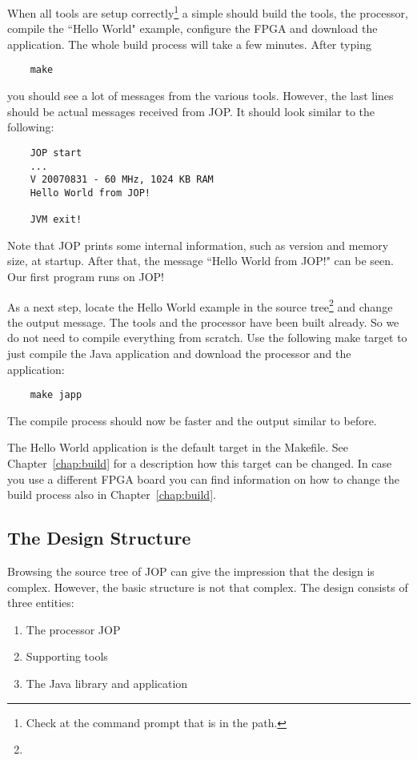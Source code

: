 When all tools are setup correctly\footnote{Check at the command
prompt that  is in the path.} a simple  should
build the tools, the processor, compile the ``Hello World" example,
configure the FPGA and download the application. The whole build
process will take a few minutes. After typing
\begin{verbatim}
    make
\end{verbatim}
you should see a lot of messages from the various tools. However,
the last lines should be actual messages received from JOP. It
should look similar to the following:
\begin{verbatim}
    JOP start
    ...
    V 20070831 - 60 MHz, 1024 KB RAM
    Hello World from JOP!

    JVM exit!
\end{verbatim}
Note that JOP prints some internal information, such as version and
memory size, at startup. After that, the message ``Hello World from
JOP!" can be seen. Our first program runs on JOP!

As a next step, locate the Hello World example in the source
tree\footnote{}
and change the output message. The tools and the processor have been
built already. So we do not need to compile everything from scratch.
Use the following make target to just compile the Java application
and download the processor and the application:
\begin{verbatim}
    make japp
\end{verbatim}
The compile process should now be faster and the output similar to
before.

The Hello World application is the default target in the Makefile.
See Chapter~\ref{chap:build} for a description how this target can be
changed. In case you use a different FPGA board you can find
information on how to change the build process also in
Chapter~\ref{chap:build}.

\subsection{The Design Structure}

Browsing the source tree of JOP can give the impression that the
design is complex. However, the basic structure is not that complex.
The design consists of three entities:
\begin{enumerate}
    \item The processor JOP
    \item Supporting tools
    \item The Java library and application
\end{enumerate}

